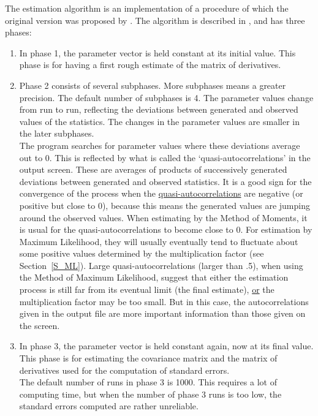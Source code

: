 \documentclass[a4paper,fleqn,11pt]{article}
\newcommand{\+}{\, + \,}
\begin{document}
The estimation algorithm is an implementation of a procedure of which
the original version was proposed by \citet{RobbinsMonro51}.
The algorithm is
described in \citet{Snijders01, Snijders05}, and
has %
three phases:
\begin{enumerate}
\item In phase 1, the parameter vector is held constant at its
initial value.
      This phase is for
      having a first rough estimate of the matrix of derivatives.
\item Phase 2 consists of several subphases.
      More subphases means a greater precision. The default
      number of subphases is 4.
      The parameter values change from run to run, reflecting
      the deviations between generated and observed values of the
      statistics. The changes in the parameter values are smaller
      in the later subphases.\\
      The program searches for parameter values where these deviations
      average out to 0. This is reflected by what is called the
      \hypertarget{T_quasiac}{`quasi-auto\-cor\-relations'}
      in the output screen.
      These are averages
      of products of successively generated deviations between
      generated and observed statistics. It is a good sign
      for the convergence of the process when the
      \hyperlink{T_quasiac}{quasi-auto\-correlations}
      are negative (or positive but close to 0),
      because this means the generated values are jumping
      around the observed values.
      When estimating by the Method of Moments, it is usual for the
      quasi-auto\-correlations to become close to 0.
      For estimation by Maximum Likelihood, they will usually
      eventually tend to fluctuate about some positive values
      determined by the multiplication factor (see Section~\ref{S_ML}).
      Large quasi-auto\-correlations (larger than .5), when using the Method of
      Maximum Likelihood, suggest that either the estimation process
      is still far from its eventual limit (the final estimate), \underline{or}
      the multiplication factor may be too small.
      But in this case, the auto\-correlations given in the output file
      are more important information than those given on the screen.
\item In phase 3, the parameter vector is held constant again,
      now at its final value.
      This phase is for estimating the covariance matrix and the
      matrix of derivatives used for the computation of standard errors.\\
      The default number of runs in phase 3 is 1000. This requires a lot
      of computing time, but when the number of phase 3 runs is too low,
      the standard errors computed are rather unreliable.
\end{enumerate}
\end{document}
